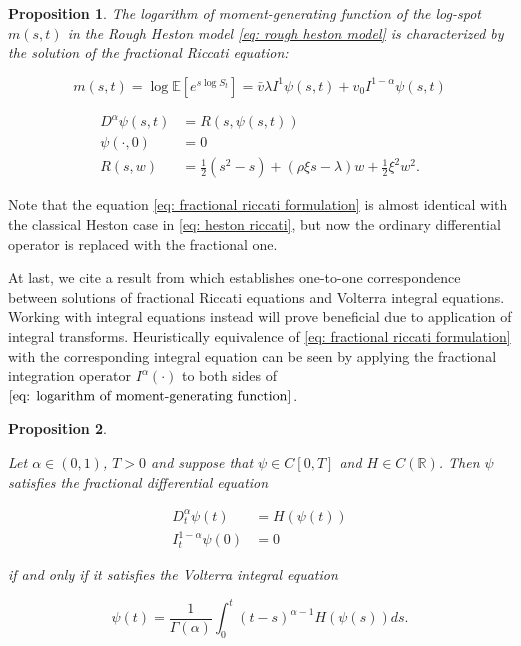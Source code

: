 \documentclass[12pt,twoside]{article}
\theoremstyle{plain}
\theoremstyle{plain}
\newtheorem{proposition}{Proposition}[section]
\theoremstyle{definition}
\theoremstyle{remark}
\numberwithin{equation}{section}
\begin{document}
\begin{proposition}

The logarithm of moment-generating function of the log-spot $m(s, t)$ in the Rough Heston model \eqref{eq: rough heston model} is characterized by the solution of the fractional Riccati equation:

\begin{equation}
\label{eq: logarithm of moment-generating function}
m(s, t) = \log \mathbb{E}\left[e^{s \log S_{t}}\right]=\bar{v} \lambda I^{1} \psi(s, t)+v_{0} I^{1-\alpha} \psi(s, t)
\end{equation}

\begin{equation}
\label{eq: fractional riccati formulation}
\begin{aligned}
D^\alpha\psi(s,t) &= R(s, \psi(s, t))\\
\psi(\cdot, 0) &= 0 \\[10pt]
R(s, w) &= \frac{1}{2}\left(s^{2}-s\right)+(\rho \xi s - \lambda) w+\frac{1}{2} \xi ^{2} w^{2}.
\end{aligned}
\end{equation}

\end{proposition}

Note that the equation \eqref{eq: fractional riccati formulation} is almost identical with the classical Heston case in \eqref{eq: heston riccati}, but now the ordinary differential operator is replaced with the fractional one.

At last, we cite a result from \cite{KST06} which establishes one-to-one correspondence between solutions of fractional Riccati equations and Volterra integral equations. Working with integral equations instead will prove beneficial due to application of integral transforms. Heuristically equivalence of \eqref{eq: fractional riccati formulation} with the corresponding integral equation can be seen by applying the fractional integration operator $I^{\alpha}(\cdot)$ to both sides of $\eqref{eq: logarithm of moment-generating function}$. 

\begin{proposition}
\label{prop: riccati iff volterra}

Let $\alpha \in (0, 1)$, $T>0$ and suppose that $\psi\in C[0, T]$ and $H\in C(\mathbb R)$. Then $\psi$ satisfies the fractional differential equation

$$
\begin{aligned} D_{t}^{\alpha} \psi(t) &=H(\psi(t)) \\ I_{t}^{1-\alpha} \psi(0) &=0 \end{aligned}
$$

if and only if it satisfies the Volterra integral equation

$$
\psi(t)=\frac{1}{\Gamma(\alpha)} \int_{0}^{t}(t-s)^{\alpha-1} H(\psi(s)) d s.
$$

\end{proposition}
\end{document}
